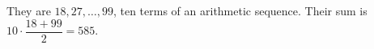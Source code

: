 They are $18,27,\ldots,99$, ten terms of an arithmetic sequence. Their sum is $10\cdot\dfrac{18+99}{2}=\boxed{585}$.
